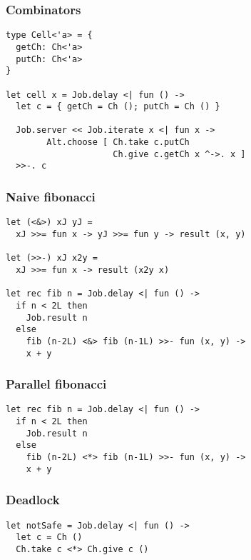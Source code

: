 \documentclass{beamer}
\begin{document}
    \begin{frame}[fragile]
        \frametitle{Combinators}
        \begin{verbatim}
type Cell<'a> = {
  getCh: Ch<'a>
  putCh: Ch<'a>
}
        
let cell x = Job.delay <| fun () ->
  let c = { getCh = Ch (); putCh = Ch () }
  
  Job.server << Job.iterate x <| fun x ->
        Alt.choose [ Ch.take c.putCh
                     Ch.give c.getCh x ^->. x ]
  >>-. c
        \end{verbatim}
    \end{frame}

    \begin{frame}[fragile]
        \frametitle{Naive fibonacci}
        \begin{verbatim}
let (<&>) xJ yJ = 
  xJ >>= fun x -> yJ >>= fun y -> result (x, y)
  
let (>>-) xJ x2y =
  xJ >>= fun x -> result (x2y x)

let rec fib n = Job.delay <| fun () ->
  if n < 2L then
    Job.result n
  else
    fib (n-2L) <&> fib (n-1L) >>- fun (x, y) ->
    x + y
        \end{verbatim}
    \end{frame}

    \begin{frame}[fragile]
        \frametitle{Parallel fibonacci}
        \begin{verbatim}
let rec fib n = Job.delay <| fun () ->
  if n < 2L then
    Job.result n
  else
    fib (n-2L) <*> fib (n-1L) >>- fun (x, y) ->
    x + y
        \end{verbatim}
    \end{frame}
    \begin{frame}[fragile]
        \frametitle{Deadlock}
        \begin{verbatim}
let notSafe = Job.delay <| fun () ->
  let c = Ch ()
  Ch.take c <*> Ch.give c ()
        \end{verbatim}
    \end{frame}
\end{document}
